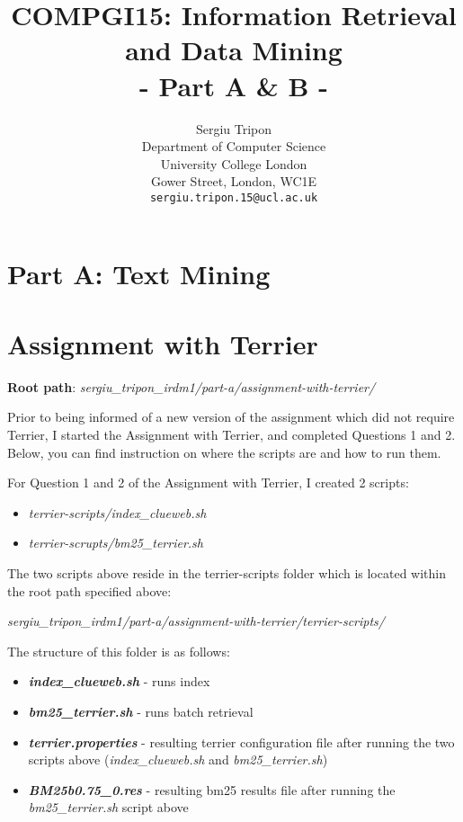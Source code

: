 \documentclass{article} %
\title{COMPGI15: Information Retrieval and Data Mining\\- Part A \& B -}
\author{
Sergiu Tripon\\
Department of Computer Science\\
University College London\\
Gower Street, London, WC1E\\
\texttt{sergiu.tripon.15@ucl.ac.uk}\\
}
\begin{document}
\maketitle

\section*{Part A: Text Mining}

\section*{Assignment with Terrier}

\textbf{Root path}: \textit{sergiu\_tripon\_irdm1/part-a/assignment-with-terrier/}

Prior to being informed of a new version of the assignment which did not require Terrier, I started the Assignment with Terrier, and completed Questions 1 and 2. Below, you can find instruction on where the scripts are and how to run them.

For Question 1 and 2 of the Assignment with Terrier, I created 2 scripts:

\begin{itemize}
    \item \textit{terrier-scripts/index\_clueweb.sh}
    \item \textit{terrier-scrupts/bm25\_terrier.sh}
\end{itemize}

The two scripts above reside in the terrier-scripts folder which is located within the root path specified above:

\textit{sergiu\_tripon\_irdm1/part-a/assignment-with-terrier/terrier-scripts/}

The structure of this folder is as follows:

\begin{itemize}
    \item \textit{\textbf{index\_clueweb.sh}} - runs index
    \item \textit{\textbf{bm25\_terrier.sh}} - runs batch retrieval
    \item \textit{\textbf{terrier.properties}} - resulting terrier configuration file after running the two scripts above (\textit{index\_clueweb.sh} and \textit{bm25\_terrier.sh})
    \item \textit{\textbf{BM25b0.75\_0.res}} - resulting bm25 results file after running the \textit{bm25\_terrier.sh} script above
\end{itemize}
\end{document}
